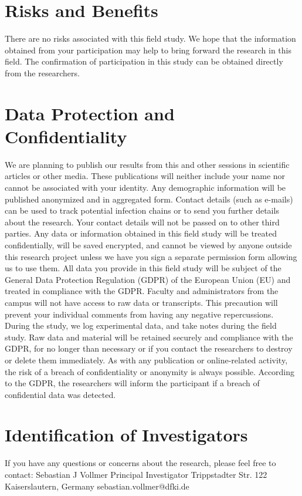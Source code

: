 \section*{Risks and Benefits}
There are no risks associated with this field study. We hope that the information obtained from your participation may help to bring forward the research in this field. The confirmation of participation in this study can be obtained directly from the researchers.

\section*{Data Protection and Confidentiality}
We are planning to publish our results from this and other sessions in scientific articles or other media. These publications will neither include your name nor cannot be associated with your identity. Any demographic information will be published anonymized and in aggregated form. Contact details (such as e-mails) can be used to track potential infection chains or to send you further details about the research. Your contact details will not be passed on to other third parties. Any data or information obtained in this field study will be treated confidentially, will be saved encrypted, and cannot be viewed by anyone outside this research project unless we have you sign a separate permission form allowing us to use them. All data you provide in this field study will be subject of the General Data Protection Regulation (GDPR) of the European Union (EU) and treated in compliance with the GDPR. Faculty and administrators from the campus will not have access to raw data or transcripts. This precaution will prevent your individual comments from having any negative repercussions. During the study, we log experimental data, and take notes during the field study. Raw data and material will be retained securely and compliance with the GDPR, for no longer than necessary or if you contact the researchers to destroy or delete them immediately. As with any publication or online-related activity, the risk of a breach of confidentiality or anonymity is always possible. According to the GDPR, the researchers will inform the participant if a breach of confidential data was detected.

\section*{Identification of Investigators}
If you have any questions or concerns about the research, please feel free to contact:\newline
Sebastian J Vollmer\newline
Principal Investigator Trippstadter Str. 122 Kaiserslautern, Germany sebastian.vollmer@dfki.de\newline


